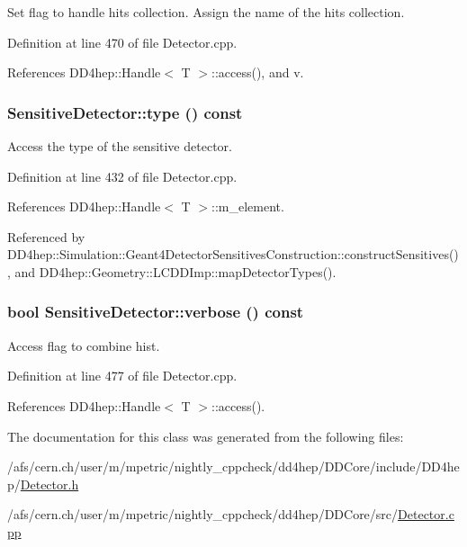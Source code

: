 Set flag to handle hits collection. Assign the name of the hits collection. 

Definition at line 470 of file Detector.cpp.

References DD4hep::Handle$<$ T $>$::access(), and v.\hypertarget{class_d_d4hep_1_1_geometry_1_1_sensitive_detector_ad68e2f554ff61e15b9b54e9f01713d41}{
\subsubsection[{type}]{ SensitiveDetector::type () const}}
\label{class_d_d4hep_1_1_geometry_1_1_sensitive_detector_ad68e2f554ff61e15b9b54e9f01713d41}


Access the type of the sensitive detector. 

Definition at line 432 of file Detector.cpp.

References DD4hep::Handle$<$ T $>$::m\_\-element.

Referenced by DD4hep::Simulation::Geant4DetectorSensitivesConstruction::constructSensitives(), and DD4hep::Geometry::LCDDImp::mapDetectorTypes().\hypertarget{class_d_d4hep_1_1_geometry_1_1_sensitive_detector_a20b5f96a1bfb953656cfa055bc3a48bc}{
\subsubsection[{verbose}]{\setlength{\rightskip}{0pt plus 5cm}bool SensitiveDetector::verbose () const}}
\label{class_d_d4hep_1_1_geometry_1_1_sensitive_detector_a20b5f96a1bfb953656cfa055bc3a48bc}


Access flag to combine hist. 

Definition at line 477 of file Detector.cpp.

References DD4hep::Handle$<$ T $>$::access().

The documentation for this class was generated from the following files:\begin{DoxyCompactItemize}
\item 
/afs/cern.ch/user/m/mpetric/nightly\_\-cppcheck/dd4hep/DDCore/include/DD4hep/\hyperlink{_detector_8h}{Detector.h}\item 
/afs/cern.ch/user/m/mpetric/nightly\_\-cppcheck/dd4hep/DDCore/src/\hyperlink{_detector_8cpp}{Detector.cpp}\end{DoxyCompactItemize}
